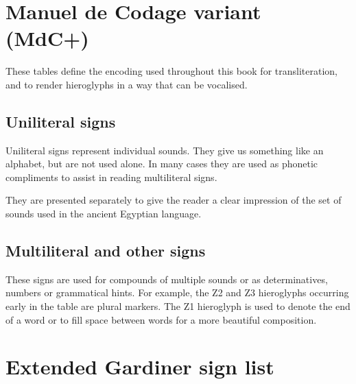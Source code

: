 \pagebreak

\section*{Manuel de Codage variant (MdC+)}

These tables define the encoding used throughout this book for transliteration, and to render hieroglyphs in a way that can be vocalised.

\subsection*{Uniliteral signs}

Uniliteral signs represent individual sounds. They give us something like an alphabet, but are not used alone. In many cases they are used as phonetic compliments to assist in reading multiliteral signs.

They are presented separately to give the reader a clear impression of the set of sounds used in the ancient Egyptian language.



\subsection*{Multiliteral and other signs}

These signs are used for compounds of multiple sounds or as determinatives, numbers or grammatical hints. For example, the Z2 and Z3 hieroglyphs occurring early in the table are plural markers. The Z1 hieroglyph is used to denote the end of a word or to fill space between words for a more beautiful composition.



\section*{Extended Gardiner sign list}
